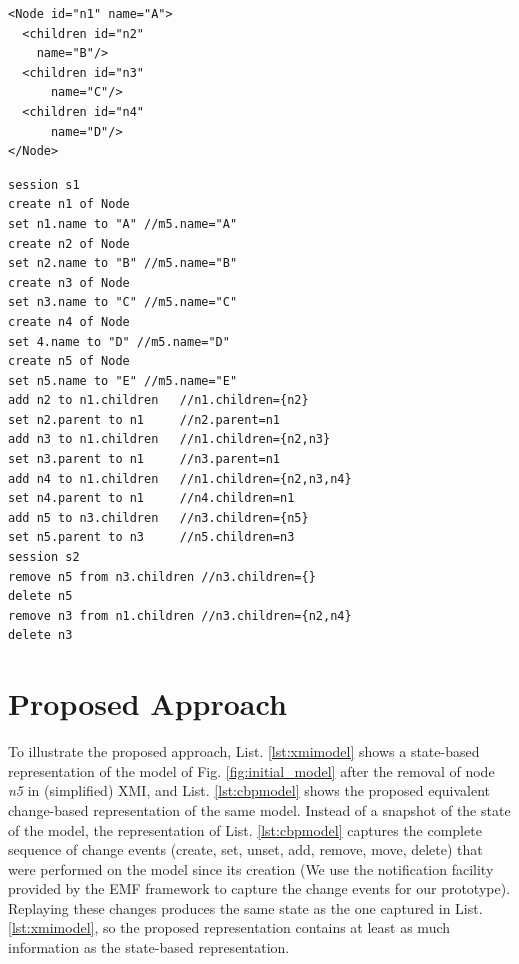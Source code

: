 \documentclass{llncs}
\begin{document}
\noindent
\begin{minipage}[t]{0.34\linewidth}
\begin{lstlisting}[style=xmi,caption={State-based representation of the model of Figure \ref{fig:initial_model} after removal of node \emph{n5} in (simplified) XMI.},label=lst:xmimodel]
<Node id="n1" name="A">
  <children id="n2" 
    name="B"/>
  <children id="n3"
      name="C"/>
  <children id="n4"
      name="D"/>
</Node>
\end{lstlisting}
\end{minipage}
\hfill
\begin{minipage}[t]{0.635\linewidth}
\begin{lstlisting}[style=eol,caption={Change-based representation of the model of Figure \ref{fig:initial_model} after removal of node \emph{n5}.},label=lst:cbpmodel]
session s1
create n1 of Node
set n1.name to "A" //m5.name="A"
create n2 of Node
set n2.name to "B" //m5.name="B"
create n3 of Node
set n3.name to "C" //m5.name="C"
create n4 of Node
set 4.name to "D" //m5.name="D"
create n5 of Node
set n5.name to "E" //m5.name="E"
add n2 to n1.children   //n1.children={n2}
set n2.parent to n1     //n2.parent=n1
add n3 to n1.children   //n1.children={n2,n3}
set n3.parent to n1     //n3.parent=n1
add n4 to n1.children   //n1.children={n2,n3,n4}
set n4.parent to n1     //n4.children=n1
add n5 to n3.children   //n3.children={n5}
set n5.parent to n3     //n5.children=n3
session s2
remove n5 from n3.children //n3.children={}
delete n5 
remove n3 from n1.children //n3.children={n2,n4}
delete n3
\end{lstlisting}
\end{minipage}

\section{Proposed Approach}
\label{sec:proposed_approach}
To illustrate the proposed approach, List. \ref{lst:xmimodel} shows a state-based representation of the model of Fig. \ref{fig:initial_model} after the removal of node \emph{n5} in (simplified) XMI, and List. \ref{lst:cbpmodel} shows the proposed equivalent change-based representation of the same model. Instead of a snapshot of the state of the model, the representation of List. \ref{lst:cbpmodel} captures the complete sequence of change events (create, set, unset, add, remove, move, delete) that were performed on the model since its creation (We use the notification facility provided by the EMF framework to capture the change events for our prototype). Replaying these changes produces the same state as the one captured in List. \ref{lst:xmimodel}, so the proposed representation contains at least as much information as the state-based representation. 
\end{document}
